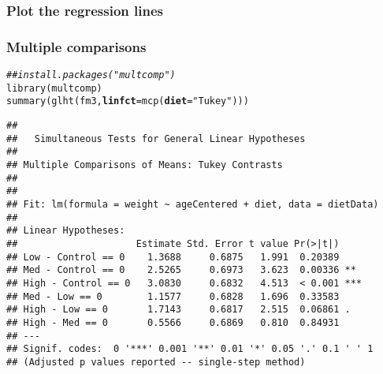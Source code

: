 \documentclass[color=usenames,dvipsnames]{beamer}\usepackage[]{graphicx}\usepackage[]{color}
\makeatletter
\newcommand{\hlstr}[1]{\textcolor[rgb]{0.749,0.012,0.012}{#1}}%
\newcommand{\hlcom}[1]{\textcolor[rgb]{0.514,0.506,0.514}{\textit{#1}}}%
\newcommand{\hlstd}[1]{\textcolor[rgb]{0,0,0}{#1}}%
\newcommand{\hlkwc}[1]{\textcolor[rgb]{0,0,0}{\textbf{#1}}}%
\newcommand{\hlkwd}[1]{\textcolor[rgb]{0.004,0.004,0.506}{#1}}%
\newenvironment{kframe}{%
 \def\at@end@of@kframe{}%
 \ifinner\ifhmode%
  \def\at@end@of@kframe{\end{minipage}}%
  \begin{minipage}{\columnwidth}%
 \fi\fi%
 \def\FrameCommand##1{\hskip\@totalleftmargin \hskip-\fboxsep
 \colorbox{shadecolor}{##1}\hskip-\fboxsep
     \hskip-\linewidth \hskip-\@totalleftmargin \hskip\columnwidth}%
 \MakeFramed {\advance\hsize-\width
   \@totalleftmargin\z@ \linewidth\hsize
   \@setminipage}}%
 {\par\unskip\endMakeFramed%
 \at@end@of@kframe}
\newenvironment{knitrout}{}{} %
\makeatother
\begin{document}
\begin{frame}
  \frametitle{Plot the regression lines}
  \vspace{-0.5cm}
  \begin{center}
  \end{center}
\end{frame}







\begin{frame}[fragile]
  \frametitle{Multiple comparisons}
\scriptsize
\begin{knitrout}
\color{fgcolor}\begin{kframe}
\begin{alltt}
\hlcom{## install.packages("multcomp")}
\hlkwd{library}\hlstd{(multcomp)}
\hlkwd{summary}\hlstd{(}\hlkwd{glht}\hlstd{(fm3,} \hlkwc{linfct}\hlstd{=}\hlkwd{mcp}\hlstd{(}\hlkwc{diet}\hlstd{=}\hlstr{"Tukey"}\hlstd{)))}
\end{alltt}
\begin{verbatim}
## 
## 	 Simultaneous Tests for General Linear Hypotheses
## 
## Multiple Comparisons of Means: Tukey Contrasts
## 
## 
## Fit: lm(formula = weight ~ ageCentered + diet, data = dietData)
## 
## Linear Hypotheses:
##                     Estimate Std. Error t value Pr(>|t|)    
## Low - Control == 0    1.3688     0.6875   1.991  0.20389    
## Med - Control == 0    2.5265     0.6973   3.623  0.00336 ** 
## High - Control == 0   3.0830     0.6832   4.513  < 0.001 ***
## Med - Low == 0        1.1577     0.6828   1.696  0.33583    
## High - Low == 0       1.7143     0.6817   2.515  0.06861 .  
## High - Med == 0       0.5566     0.6869   0.810  0.84931    
## ---
## Signif. codes:  0 '***' 0.001 '**' 0.01 '*' 0.05 '.' 0.1 ' ' 1
## (Adjusted p values reported -- single-step method)
\end{verbatim}
\end{kframe}
\end{knitrout}
\end{frame}
\end{document}
